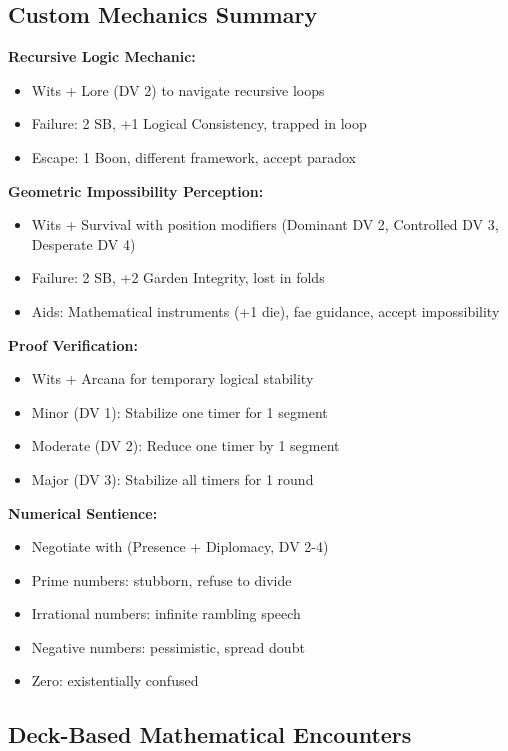 \documentclass[11pt]{article}
\begin{document}
\subsection*{Custom Mechanics Summary}

\textbf{Recursive Logic Mechanic:}
\begin{itemize}
\item Wits + Lore (DV 2) to navigate recursive loops
\item Failure: 2 SB, +1 Logical Consistency, trapped in loop
\item Escape: 1 Boon, different framework, accept paradox
\end{itemize}

\textbf{Geometric Impossibility Perception:}
\begin{itemize}
\item Wits + Survival with position modifiers (Dominant DV 2, Controlled DV 3, Desperate DV 4)
\item Failure: 2 SB, +2 Garden Integrity, lost in folds
\item Aids: Mathematical instruments (+1 die), fae guidance, accept impossibility
\end{itemize}

\textbf{Proof Verification:}
\begin{itemize}
\item Wits + Arcana for temporary logical stability
\item Minor (DV 1): Stabilize one timer for 1 segment
\item Moderate (DV 2): Reduce one timer by 1 segment
\item Major (DV 3): Stabilize all timers for 1 round
\end{itemize}

\textbf{Numerical Sentience:}
\begin{itemize}
\item Negotiate with (Presence + Diplomacy, DV 2-4)
\item Prime numbers: stubborn, refuse to divide
\item Irrational numbers: infinite rambling speech
\item Negative numbers: pessimistic, spread doubt
\item Zero: existentially confused
\end{itemize}

\subsection*{Deck-Based Mathematical Encounters}
\end{document}
